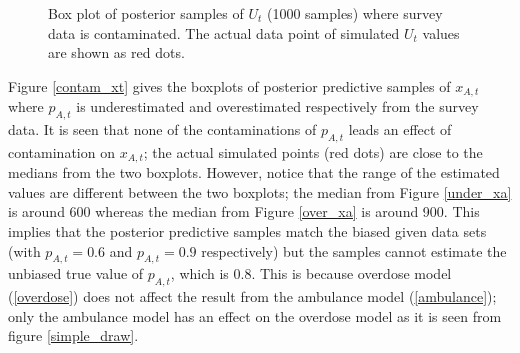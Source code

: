 \documentclass[12pt]{article}
\begin{document}
{\begin{figure}[htb]
	\centering
	\caption[Contaminated $p_{A,t}$: boxplot of posterior samples of $U_t$]{Box plot of posterior samples of $U_t$ (1000 samples) where survey data is contaminated.  The actual data point of simulated $U_t$ values are shown as red dots.}
	\label{contam_ut}
\end{figure}

Figure \ref{contam_xt}  gives the boxplots of posterior predictive samples of $x_{A,t}$ where $p_{A,t}$ is underestimated and overestimated respectively from the survey data. It is seen that none of the contaminations of $p_{A,t}$ leads an effect of contamination on $x_{A,t}$; the actual simulated points (red dots) are close to the medians from the two boxplots. However, notice that the range of the estimated values are different between the two boxplots; the median from Figure \ref{under_xa} is around 600 whereas the median from Figure \ref{over_xa} is around 900. This implies that the posterior predictive samples match the biased given data sets (with $p_{A,t}=0.6$ and $p_{A,t}=0.9$ respectively) but the samples cannot estimate the unbiased true value of $p_{A,t}$, which is 0.8. This is because overdose model (\ref{overdose}) does not affect the result from the ambulance model (\ref{ambulance}); only the ambulance model has an effect on the overdose model as it is seen from figure \ref{simple_draw}.

}
\end{document}
